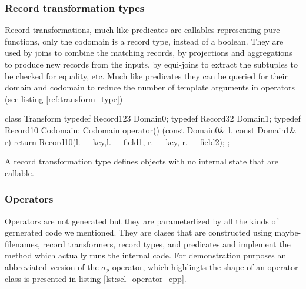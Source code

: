 \subsubsection{Record transformation types}

Record transformations, much like predicates are callables
representing pure functions, only the codomain is a record type,
instead of a boolean. They are used by joins to combine the matching
records, by projections and aggregations to produce new records from
the inputs, by equi-joins to extract the subtuples to be checked for
equality, etc. Much like predicates they can be queried for their
domain and codomain to reduce the number of template arguments in
operators (see listing \ref{ref:transform_type})

\begin{code}
\begin{cppcode}
class Transform {
  typedef Record123 Domain0;
  typedef Record32 Domain1;
  typedef Record10 Codomain;
  Codomain operator() (const Domain0& l, const Domain1& r) {
    return Record10(l.__key,l.__field1, r.__key, r.__field2);
  }
};
\end{cppcode}
  \caption{\label{ref:transform_type}A record transformation type
    defines objects with no internal state that are callable.}
\end{code}


\subsubsection{Operators}

Operators are not generated but they are parameterlized by all the
kinds of gernerated code we mentioned. They are clases that are
constructed using maybe-filenames, record transformers, record types,
and predicates and implement the  method which actually
runs the internal code. For demonstration purposes an abbreviated
version of the \(\sigma_p\) operator, which highlingts the shape of an
operator class is presented in listing \ref{lst:sel_operator_cpp}.

